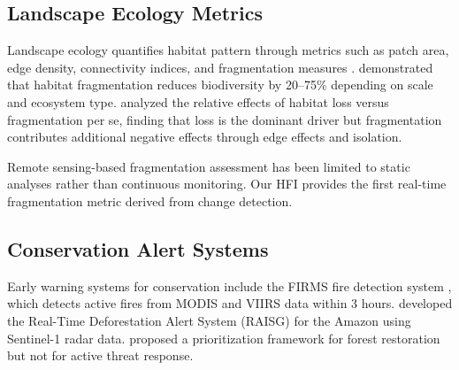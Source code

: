 \subsection{Landscape Ecology Metrics}

Landscape ecology quantifies habitat pattern through metrics such as patch area, edge density, connectivity indices, and fragmentation measures \citep{mcgarigal2012fragstats}.
\citet{haddad2015habitat} demonstrated that habitat fragmentation reduces biodiversity by 20--75\% depending on scale and ecosystem type.
\citet{fahrig2017ecological} analyzed the relative effects of habitat loss versus fragmentation per se, finding that loss is the dominant driver but fragmentation contributes additional negative effects through edge effects and isolation.

Remote sensing-based fragmentation assessment has been limited to static analyses \citep{vogt2007mapping} rather than continuous monitoring.
Our HFI provides the first real-time fragmentation metric derived from change detection.

\subsection{Conservation Alert Systems}

Early warning systems for conservation include the FIRMS fire detection system \citep{giglio2016active}, which detects active fires from MODIS and VIIRS data within 3 hours.
\citet{finer2018combating} developed the Real-Time Deforestation Alert System (RAISG) for the Amazon using Sentinel-1 radar data.
\citet{brancalion2020global} proposed a prioritization framework for forest restoration but not for active threat response.

